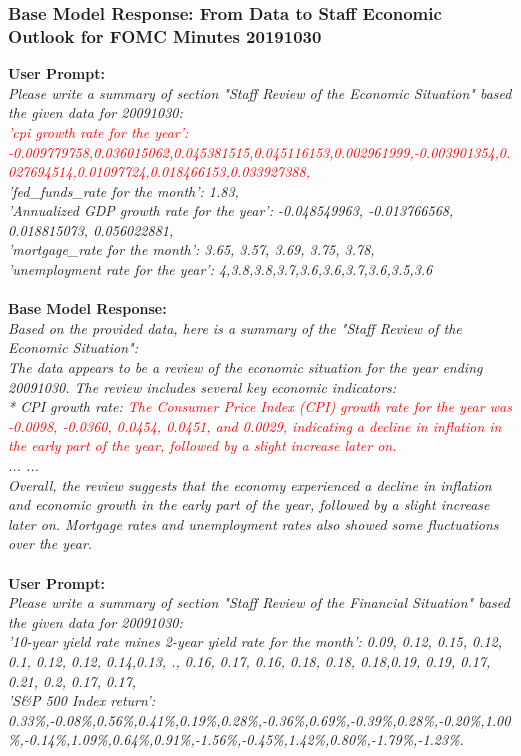 \subsubsection{Base Model Response: From Data to Staff Economic Outlook for FOMC Minutes 20191030}\label{base_model}

\textbf{User Prompt:}\\
{\footnotesize
\textit{
Please write a summary of section "Staff Review of the Economic Situation" based the given data for 20091030: \\
\textcolor{red}{'cpi growth rate for the year': -0.009779758,0.036015062,0.045381515,0.045116153,0.002961999,-0.003901354,0.027694514,0.01097724,0.018466153,0.033927388,} \\
'fed\_funds\_rate for the month': 1.83, \\
'Annualized GDP growth rate for the year': -0.048549963, -0.013766568, 0.018815073, 0.056022881, \\
'mortgage\_rate for the month': 3.65, 3.57, 3.69, 3.75, 3.78, \\
'unemployment rate for the year': 4,3.8,3.8,3.7,3.6,3.6,3.7,3.6,3.5,3.6}
}\\
~\\
\textbf{Base Model Response:}\\
{\footnotesize
\textit{
    Based on the provided data, here is a summary of the "Staff Review of the Economic Situation":\\
    The data appears to be a review of the economic situation for the year ending 20091030. The review includes several key economic indicators:\\
    * CPI growth rate: \textcolor{red}{The Consumer Price Index (CPI) growth rate for the year was -0.0098, -0.0360, 0.0454, 0.0451, and 0.0029, indicating a decline in inflation in the early part of the year, followed by a slight increase later on.}\\
    ... ...\\
    Overall, the review suggests that the economy experienced a decline in inflation and economic growth in the early part of the year, followed by a slight increase later on. Mortgage rates and unemployment rates also showed some fluctuations over the year.
}}\\
~\\
\textbf{User Prompt:}\\
{\footnotesize
\textit{
Please write a summary of section "Staff Review of the Financial Situation" based the given data for 20091030: \\
'10-year yield rate mines 2-year yield rate for the month': 0.09, 0.12, 0.15, 0.12, 0.1, 0.12, 0.12, 0.14,0.13, ., 0.16, 0.17, 0.16, 0.18, 0.18, 0.18,0.19, 0.19, 0.17, 0.21, 0.2, 0.17, 0.17, \\
'S\&P 500 Index return': 0.33\%,-0.08\%,0.56\%,0.41\%,0.19\%,0.28\%,-0.36\%,0.69\%,-0.39\%,0.28\%,-0.20\%,1.00\%,-0.14\%,1.09\%,0.64\%,0.91\%,-1.56\%,-0.45\%,1.42\%,0.80\%,-1.79\%,-1.23\%.}
}\\
